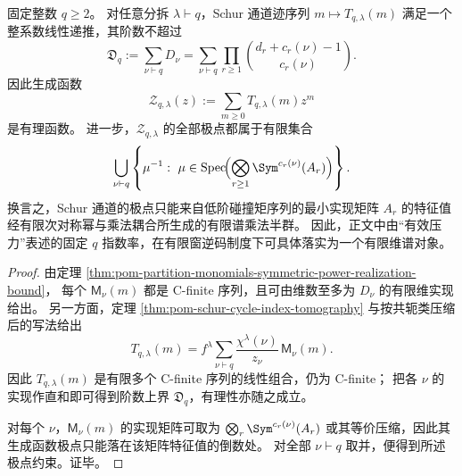 \begin{theorem}\label{thm:pom-schur-channels-cfinite-spectral-multiplicative-semigroup}
固定整数 \(q\ge 2\)。
对任意分拆 \(\lambda\vdash q\)，Schur 通道迹序列 \(m\mapsto T_{q,\lambda}(m)\) 满足一个整系数线性递推，其阶数不超过
\[
\mathfrak D_q:=\sum_{\nu\vdash q}D_\nu
=
\sum_{\nu\vdash q}\prod_{r\ge 1}\binom{d_r+c_r(\nu)-1}{c_r(\nu)}.
\]
因此生成函数
\[
\mathcal Z_{q,\lambda}(z):=\sum_{m\ge 0}T_{q,\lambda}(m)z^m
\]
是有理函数。
进一步，\(\mathcal Z_{q,\lambda}\) 的全部极点都属于有限集合
\[
\bigcup_{\nu\vdash q}
\left\{
\mu^{-1}:\ 
\mu\in
\mathrm{Spec}\!\Bigl(\bigotimes_{r\ge 1}\Sym^{c_r(\nu)}(A_r)\Bigr)
\right\}.
\]
换言之，Schur 通道的极点只能来自低阶碰撞矩序列的最小实现矩阵 \(A_r\) 的特征值经有限次对称幂与乘法耦合所生成的有限谱乘法半群。
因此，正文中由“有效压力”表述的固定 \(q\) 指数率，在有限窗逆码制度下可具体落实为一个有限维谱对象。
\end{theorem}
\begin{proof}
由定理 \ref{thm:pom-partition-monomials-symmetric-power-realization-bound}，
每个 \(\mathsf{M}_\nu(m)\) 都是 C-finite 序列，且可由维数至多为 \(D_\nu\) 的有限维实现给出。
另一方面，定理 \ref{thm:pom-schur-cycle-index-tomography} 与按共轭类压缩后的写法给出
\[
T_{q,\lambda}(m)
=
f^\lambda\sum_{\nu\vdash q}\frac{\chi^\lambda(\nu)}{z_\nu}\,\mathsf{M}_\nu(m).
\]
因此 \(T_{q,\lambda}(m)\) 是有限多个 C-finite 序列的线性组合，仍为 C-finite；
把各 \(\nu\) 的实现作直和即可得到阶数上界 \(\mathfrak D_q\)，有理性亦随之成立。

对每个 \(\nu\)，\(\mathsf{M}_\nu(m)\) 的实现矩阵可取为
\(
\bigotimes_r \Sym^{c_r(\nu)}(A_r)
\)
或其等价压缩，因此其生成函数极点只能落在该矩阵特征值的倒数处。
对全部 \(\nu\vdash q\) 取并，便得到所述极点约束。证毕。
\end{proof}

